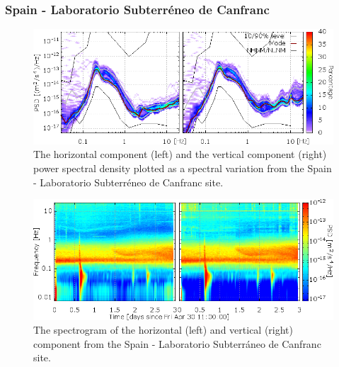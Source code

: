 \subsubsection*{Spain - Laboratorio Subterr\'eneo de Canfranc}
\begin{figure}[h]
\centering
\includegraphics[width=\textwidth]{./Sec_SiteInfra/Figures/results/Canfranc-B_multiplot1}
\caption{The horizontal component (left) and the vertical component (right) power spectral density plotted as a spectral variation from the Spain - Laboratorio Subterr\'eneo de Canfranc site.}
\label{fig:Canfranc-B_multiplot1}
\end{figure}\begin{figure}[h]
\centering
\includegraphics[width=\textwidth]{./Sec_SiteInfra/Figures/results/Canfranc-B_multiplot2}
\caption{The spectrogram of the horizontal (left) and vertical (right) component from the Spain - Laboratorio Subterráneo de Canfranc site.}
\label{fig:Canfranc-B_multiplot2}
\end{figure}

\pagebreak
\FloatBarrier

